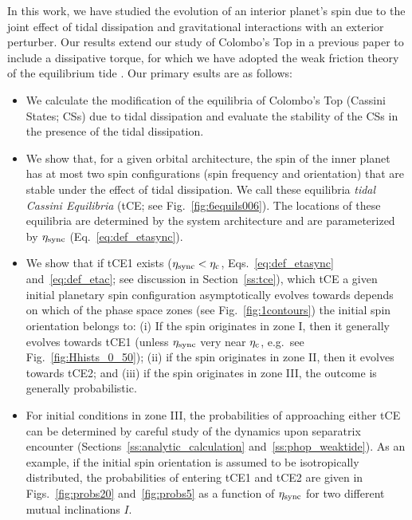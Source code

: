 \documentclass[
        fleqn,
        usenatbib,
        referee
    ]{mnras}
\begin{document}
In this work, we have studied the evolution of an interior planet's spin due to
the joint effect of tidal dissipation and gravitational interactions with an
exterior perturber. Our results extend our study of Colombo's Top in a previous
paper \citep{su2020} to include a dissipative torque, for which we have adopted
the weak friction theory of the equilibrium tide \citep{lai2012}. Our primary
esults are as follows:
\begin{itemize}
    \item We calculate the modification of the equilibria of Colombo's Top
        (Cassini States; CSs) due to tidal dissipation and evaluate the
        stability of the CSs in the presence of the tidal dissipation.

    \item We show that, for a given orbital architecture, the spin of the inner
        planet has at most two spin configurations (spin frequency and
        orientation) that are stable under the effect of tidal dissipation. We
        call these equilibria \emph{tidal Cassini Equilibria} (tCE\@; see
        Fig.~\ref{fig:6equils006}). The locations of these equilibria are
        determined by the system architecture and are parameterized by
        $\eta_{\rm sync}$ (Eq.~\ref{eq:def_etasync}).

    \item We show that if tCE1 exists ($\eta_{\rm sync} < \eta_{\rm c}$,
        Eqs.~\ref{eq:def_etasync} and~\ref{eq:def_etac}; see discussion in
        Section~\ref{ss:tce}), which tCE a given initial planetary spin
        configuration asymptotically evolves towards depends on which of the
        phase space zones (see Fig.~\ref{fig:1contours}) the initial spin
        orientation belongs to: (i) If the spin originates in zone I, then it
        generally evolves towards tCE1 (unless $\eta_{\rm sync}$ very near
        $\eta_{\rm c}$, e.g.\ see Fig.~\ref{fig:Hhists_0_50}); (ii) if the spin
        originates in zone II, then it evolves towards tCE2; and (iii) if the
        spin originates in zone III, the outcome is generally probabilistic.

    \item For initial conditions in zone III, the probabilities of approaching
        either tCE can be determined by careful study of the dynamics upon
        separatrix encounter (Sections~\ref{ss:analytic_calculation}
        and~\ref{ss:phop_weaktide}). As an example, if the initial spin
        orientation is assumed to be isotropically distributed, the
        probabilities of entering tCE1 and tCE2 are given in
        Figs.~\ref{fig:probs20} and~\ref{fig:probs5} as a function of $\eta_{\rm
        sync}$ for two different mutual inclinations $I$.


\end{itemize}
\end{document}
